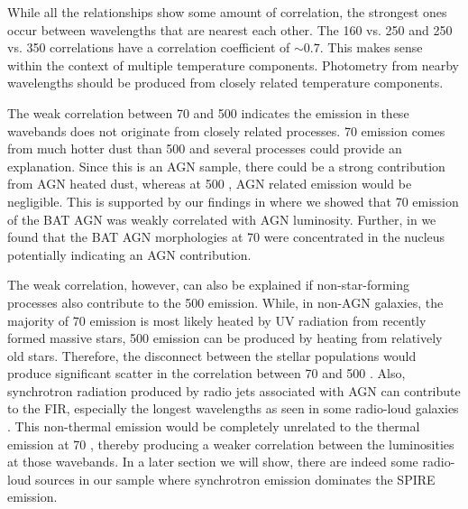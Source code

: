 While all the relationships show some amount of correlation, the strongest ones occur between wavelengths that are nearest each other. The 160 vs. 250 \um{} and 250 vs. 350 \um{} correlations have a correlation coefficient of $\sim0.7$. This makes sense within the context of multiple temperature components. Photometry from nearby wavelengths should be produced from closely related temperature components.

The weak correlation between 70 and 500 \um{} indicates the emission in these wavebands does not originate from closely related processes. 70 \um{} emission comes from much hotter dust than 500 \um{} and several processes could provide an explanation. Since this is an AGN sample, there could be a strong contribution from AGN heated dust, whereas at 500 \um{}, AGN related emission would be negligible. This is supported by our findings in \citet{Melendez:2014yu} where we showed that 70 \um{} emission of the BAT AGN was weakly correlated with AGN luminosity. Further, in \citep{Mushotzky:2014ad} we found that the BAT AGN morphologies at 70 \um{} were concentrated in the nucleus potentially indicating an AGN contribution.

The weak correlation, however, can also be explained if non-star-forming processes also contribute to the 500 \um{} emission. While, in non-AGN galaxies, the majority of 70 \um{} emission is most likely heated by UV radiation from recently formed massive stars, 500 \um{} emission can be produced by heating from relatively old stars. Therefore, the disconnect between the stellar populations would produce significant scatter in the correlation between 70 and 500 \um. Also, synchrotron radiation produced by radio jets associated with AGN can contribute to the FIR, especially the longest wavelengths as seen in some radio-loud galaxies \citep{Baes:2010ek, Boselli:2010fr}. This non-thermal emission would be completely unrelated to the thermal emission at 70 \um, thereby producing a weaker correlation between the luminosities at those wavebands. In a later section we will show, there are indeed some radio-loud sources in our sample where synchrotron emission dominates the SPIRE emission. 
